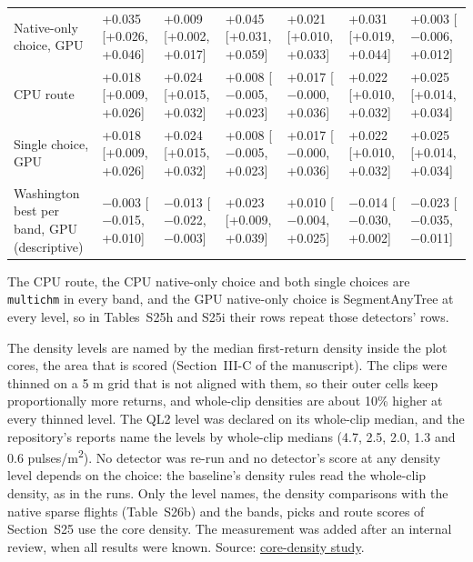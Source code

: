 \documentclass[10pt]{article}
\makeatletter
\newcommand\suppFloatBarrier{\par\addpenalty\z@
  \ifx\@deferlist\@empty\else\expandafter\supp@flush\fi}
\newcommand\supp@flush{\let\supp@waiting\@deferlist
  \newpage
  \ifx\@deferlist\supp@waiting\null\newpage\fi
  \ifx\@deferlist\supp@waiting\expandafter\clearpage\else\expandafter\suppFloatBarrier\fi}
\gdef\supp@afterheading{}
\renewcommand\section{\suppFloatBarrier
    \gdef\supp@afterheading{\suppressfloats[t]\gdef\supp@afterheading{}}\supp@section}}
\makeatother
\begin{document}
{\begin{xltabular}{\textwidth}{LLLLLLL}
Native-only choice, GPU & +0.035 [+0.026, +0.046] & +0.009 [+0.002, +0.017] & +0.045 [+0.031, +0.059] & +0.021 [+0.010, +0.033] & +0.031 [+0.019, +0.044] & +0.003 [$-$0.006, +0.012] \\
CPU route & +0.018 [+0.009, +0.026] & +0.024 [+0.015, +0.032] & +0.008 [$-$0.005, +0.023] & +0.017 [$-$0.000, +0.036] & +0.022 [+0.010, +0.032] & +0.025 [+0.014, +0.034] \\
Single choice, GPU & +0.018 [+0.009, +0.026] & +0.024 [+0.015, +0.032] & +0.008 [$-$0.005, +0.023] & +0.017 [$-$0.000, +0.036] & +0.022 [+0.010, +0.032] & +0.025 [+0.014, +0.034] \\
Washington best per band, GPU (descriptive) & $-$0.003 [$-$0.015, +0.010] & $-$0.013 [$-$0.022, $-$0.003] & +0.023 [+0.009, +0.039] & +0.010 [$-$0.004, +0.025] & $-$0.014 [$-$0.030, +0.002] & $-$0.023 [$-$0.035, $-$0.011] \\
\end{xltabular}
}

The CPU route, the CPU native-only choice and both single choices are
\texttt{multichm} in every band, and the GPU native-only choice is SegmentAnyTree at
every level, so in Tables~S25h and S25i their rows repeat those detectors'
rows.

\section*{S26. Density Inside the Plot Cores}

The density levels are named by the median first-return density inside the plot
cores, the area that is scored (Section~III-C of the manuscript). The clips were
thinned on a 5 m grid that is not aligned with them, so their outer cells keep
proportionally more returns, and whole-clip densities are about 10\% higher at
every thinned level. The QL2 level was declared on its whole-clip median, and
the repository's reports name the levels by whole-clip medians (4.7, 2.5, 2.0,
1.3 and 0.6 pulses/m\textsuperscript{2}). No detector was re-run and no detector's score at any
density level depends on the choice: the baseline's density rules read the
whole-clip density, as in the runs. Only the level names, the density
comparisons with the native sparse flights (Table~S26b) and the bands, picks
and route scores of Section~S25 use the core density. The measurement was added
after an internal review, when all results were known. Source: \href{https://github.com/devakellc/lidar-tree-benchmark/blob/main/results/core-density-results.md}{core-density
study}.
\end{document}
